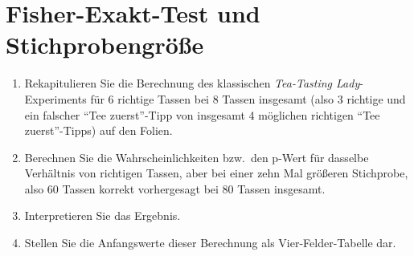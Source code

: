 \section{Fisher-Exakt-Test und Stichprobengröße}

\begin{enumerate}\Lf
  \item Rekapitulieren Sie die Berechnung des klassischen \textit{Tea-Tasting Lady}-Experiments für 6 richtige Tassen bei 8 Tassen insgesamt (also 3 richtige und ein falscher "`Tee zuerst"'-Tipp von insgesamt 4 möglichen richtigen "`Tee zuerst"'-Tipps) auf den Folien.
  \item Berechnen Sie die Wahrscheinlichkeiten bzw.\ den p-Wert für dasselbe Verhältnis von richtigen Tassen, aber bei einer zehn Mal größeren Stichprobe, also 60 Tassen korrekt vorhergesagt bei 80 Tassen insgesamt.\label{ex:1b}
  \item Interpretieren Sie das Ergebnis.\label{ex:1c}
  \item Stellen Sie die Anfangswerte dieser Berechnung als Vier-Felder-Tabelle dar.\label{ex:1d}
\end{enumerate}


